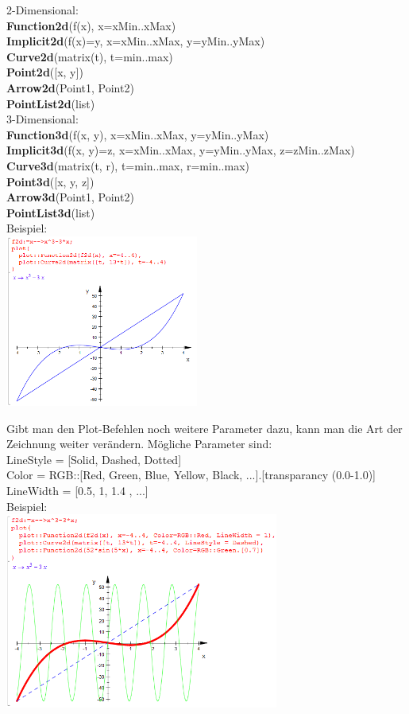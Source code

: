 \documentclass[11pt,final]{scrreprt}
\begin{document}
2-Dimensional: \\
\textbf{Function2d}(f(x), x=xMin..xMax)\\
\textbf{Implicit2d}(f(x)=y, x=xMin..xMax, y=yMin..yMax)\\
\textbf{Curve2d}(matrix(t), t=min..max)\\
\textbf{Point2d}([x, y])\\
\textbf{Arrow2d}(Point1, Point2)\\
\textbf{PointList2d}(list)\\

3-Dimensional: \\
\textbf{Function3d}(f(x, y), x=xMin..xMax, y=yMin..yMax)\\
\textbf{Implicit3d}(f(x, y)=z, x=xMin..xMax, y=yMin..yMax, z=zMin..zMax)\\
\textbf{Curve3d}(matrix(t, r), t=min..max, r=min..max)\\
\textbf{Point3d}([x, y, z])\\
\textbf{Arrow3d}(Point1, Point2)\\
\textbf{PointList3d}(list)\\

Beispiel:\\
\includegraphics[width = 240px]{images/plot_1}

Gibt man den Plot-Befehlen noch weitere Parameter dazu, kann man die Art der Zeichnung weiter verändern. Mögliche Parameter sind:\\
LineStyle = [Solid, Dashed, Dotted]\\
Color = RGB::[Red, Green, Blue, Yellow, Black, ...].[transparancy (0.0-1.0)]\\
LineWidth = [0.5, 1, 1.4 , ...]\\

Beispiel:\\
\includegraphics[width = 340px]{images/plot_2}
\end{document}
